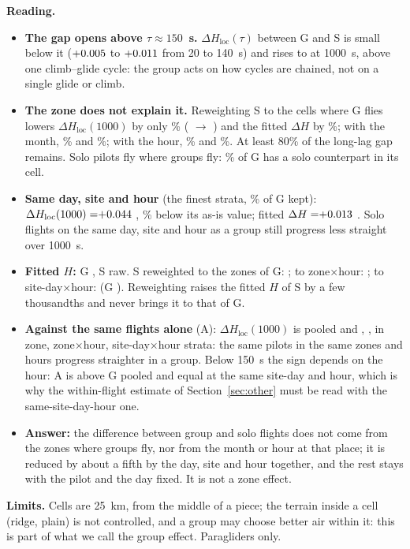\begin{reading}
\textbf{Reading.}
\begin{itemize}
  \item \textbf{The gap opens above $\tau\approx150$~s.} $\Delta H_\mathrm{loc}(\tau)$ between G and S is small below it ($\ZoneShortMin$ to $\ZoneShortMax$ from 20 to 140~s)
        and rises to \ZoneDHlocSNone{} at 1000~s, above one climb--glide cycle: the group acts on how cycles are chained, not on a single glide or climb.
  \item \textbf{The zone does not explain it.} Reweighting S to the cells where G flies lowers $\Delta H_\mathrm{loc}(1000)$ by only \ZoneRedLocZone\%
        (\ZoneDHlocSupportZone{} $\to$ \ZoneDHlocSZone) and the fitted $\Delta H$ by \ZoneRedHZone\%; with the month, \ZoneRedLocZoneMonth\% and \ZoneRedHZoneMonth\%; with the
        hour, \ZoneRedLocZoneHour\% and \ZoneRedHZoneHour\%. At least 80\% of the long-lag gap remains. Solo pilots fly where groups fly: \ZoneKeptZone\% of G has a solo
        counterpart in its cell.
  \item \textbf{Same day, site and hour} (the finest strata, \ZoneKeptSdh\% of G kept): $\Delta H_\mathrm{loc}(1000)=\ZoneDHlocSSdh$ \ZoneDHlocSSdhBand, \ZoneRedLocSdh\% below its as-is value;
        fitted $\Delta H=\ZoneDHSSdh$ \ZoneDHSSdhBand. Solo flights on the same day, site and hour as a group still progress less straight over 1000~s.
  \item \textbf{Fitted $H$:} G \ZoneHNoneG{}, S \ZoneHNoneS{} raw. S reweighted to the zones of G: \ZoneHZoneS{}; to zone$\times$hour: \ZoneHZoneHourS{}; to site-day$\times$hour: \ZoneHSdhS{} (G \ZoneHSdhG).
        Reweighting raises the fitted $H$ of S by a few thousandths and never brings it to that of G.
  \item \textbf{Against the same flights alone} (A): $\Delta H_\mathrm{loc}(1000)$ is \ZoneDHlocANone{} pooled and \ZoneDHlocAZone, \ZoneDHlocAZoneHour, \ZoneDHlocASdh{} in zone, zone$\times$hour,
        site-day$\times$hour strata: the same pilots in the same zones and hours progress straighter in a group. Below 150~s the sign depends on the hour: A is above G pooled and equal at the same site-day and hour,
        which is why the within-flight estimate of Section~\ref{sec:other} must be read with the same-site-day-hour one.
  \item \textbf{Answer:} the difference between group and solo flights does not come from the zones where groups fly, nor from the month or hour at that place;
        it is reduced by about a fifth by the day, site and hour together, and the rest stays with the pilot and the day fixed. It is not a zone effect.
\end{itemize}
\textbf{Limits.} Cells are 25~km, from the middle of a piece; the terrain inside a cell (ridge, plain) is not controlled, and a group may choose better air within it:
this is part of what we call the group effect. Paragliders only.
\end{reading}
